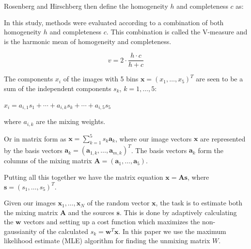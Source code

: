 \documentclass[a4paper,11pt]{article}
\begin{document}
Rosenberg and Hirschberg then define the homogeneity $h$ and completeness $c$ as:

    



In this study, methods were evaluated according to a combination of both homogeneity $h$ and completeness $c$. This combination is called the V-measure and is the harmonic mean of homogeneity and completeness.

\begin{equation}
v = 2 \cdot \frac{h \cdot c}{h + c}
\end{equation}

The components $x_i$ of the images with 5 bins $\boldsymbol{x}=(x_1,\ldots,x_5)^T$ are seen to be a sum of the independent components $s_k$, $k=1,\ldots,5$:

$x_i = a_{i,1} s_1 + \cdots + a_{i,k} s_k + \cdots + a_{i,5} s_5$

where $a_{i,k}$ are the mixing weights.

Or in matrix form as $\boldsymbol{x}=\sum_{k=1}^{5} s_k \boldsymbol{a}_k$, where our image vectors $\boldsymbol{x}$ are represented by the basis vectors $\boldsymbol{a}_k=(\boldsymbol{a}_{1,k},\ldots,\boldsymbol{a}_{m,k})^T$. The basis vectors $\boldsymbol{a}_k$ form the columns of the mixing matrix $\boldsymbol{A}=(\boldsymbol{a}_1,\ldots,\boldsymbol{a}_5)$.

Putting all this together we have the matrix equation $\boldsymbol{x}=\boldsymbol{A} \boldsymbol{s}$, where $\boldsymbol{s}=(s_1,\ldots,s_5)^T$.

Given our images $\boldsymbol{x}_1,\ldots,\boldsymbol{x}_N$ of the random vector $\boldsymbol{x}$, the task is to estimate both the mixing matrix $\boldsymbol{A}$ and the sources $\boldsymbol{s}$. This is done by adaptively calculating the $\boldsymbol{w}$ vectors and setting up a cost function which maximizes the non-gaussianity of the calculated $s_k = \boldsymbol{w}^T \boldsymbol{x}$. In this paper we use the maximum likelihood estimate (MLE) algorithm for finding the unmixing matrix $W$. 









\vfill









\end{document}

